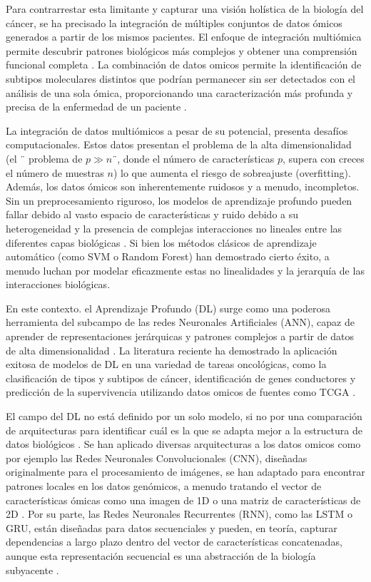 \documentclass[preprint,number]{elsarticle}
\begin{document}
Para contrarrestar esta limitante y capturar una visión holística de la biología del cáncer, se ha precisado la integración de múltiples conjuntos de datos ómicos generados a partir de los mismos pacientes. El enfoque de integración multiómica permite descubrir patrones biológicos más complejos y obtener una comprensión funcional completa \cite{hernandez2024methods}. La combinación de datos omicos permite la identificación de subtipos moleculares distintos que podrían permanecer sin ser detectados con el análisis de una sola ómica, proporcionando una caracterización más profunda y precisa de la enfermedad de un paciente \cite{kutlay2021integrative}.

La integración de datos multiómicos a pesar de su potencial, presenta desafíos computacionales. Estos datos presentan el problema de la alta dimensionalidad (el ¨ problema de $p \gg n$¨, donde el número de características $p$, supera con creces el número de muestras $n$) lo que aumenta el riesgo de sobreajuste (overfitting). Además, los datos ómicos son inherentemente ruidosos y a menudo, incompletos. Sin un preprocesamiento riguroso, los modelos de aprendizaje profundo pueden fallar debido al vasto espacio de características y ruido debido a su heterogeneidad y la presencia de complejas interacciones no lineales entre las diferentes capas biológicas \cite{libbrecht2015machine}. Si bien los métodos clásicos de aprendizaje automático (como SVM o Random Forest) han demostrado cierto éxito, a menudo luchan por modelar eficazmente estas no linealidades y la jerarquía de las interacciones biológicas.

En este contexto. el Aprendizaje Profundo (DL) surge como una poderosa herramienta del subcampo de las redes Neuronales Artificiales (ANN), capaz de aprender de representaciones jerárquicas y patrones complejos a partir de datos de alta dimensionalidad \cite{lecun2015deep}. La literatura reciente ha demostrado la aplicación exitosa de modelos de DL en una variedad de tareas oncológicas, como la clasificación de tipos y subtipos de cáncer, identificación de genes conductores y predicción de la supervivencia utilizando datos omicos de fuentes como TCGA \cite{sartori2025comprehensive}. 

El campo del DL no está definido por un solo modelo, si no por una comparación de arquitecturas para identificar cuál es la que se adapta mejor a la estructura de datos biológicos \cite{sartori2025comprehensive}. Se han aplicado diversas arquitecturas a los datos omicos como por ejemplo las Redes Neuronales Convolucionales (CNN), diseñadas originalmente para el procesamiento de imágenes, se han adaptado para encontrar patrones locales en los datos genómicos, a menudo tratando el vector de características ómicas como una imagen de 1D o una matriz de características de 2D \cite{ye2021genomic,chuang2021convolutional}. Por su parte, las Redes Neuronales Recurrentes (RNN), como las LSTM o GRU, están diseñadas para datos secuenciales y pueden, en teoría, capturar dependencias a largo plazo dentro del vector de características concatenadas, aunque esta representación secuencial es una abstracción de la biología subyacente \cite{parthasarathy2025novel,barbadilla2025predicting}.
\end{document}
